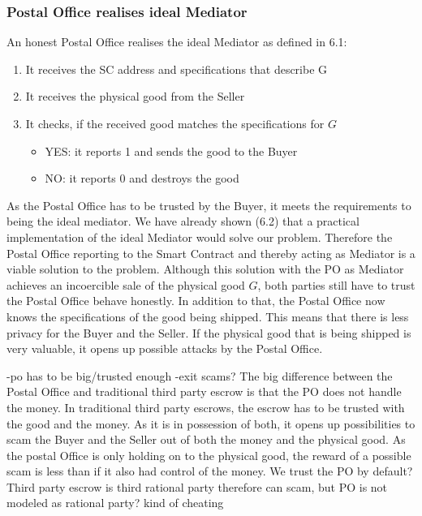 \documentclass{cacthesis}
\begin{document}
\subsubsection{Postal Office realises ideal Mediator}
An honest Postal Office realises the ideal Mediator as defined in 6.1:
\begin{enumerate}
    \item It receives the SC address and specifications that describe G
    \item It receives the physical good from the Seller
    \item It checks, if the received good matches the specifications for $G$
        \begin{itemize}
            \item YES: it reports 1 and sends the good to the Buyer
            \item NO: it reports 0 and destroys the good
        \end{itemize}
\end{enumerate}
As the Postal Office has to be trusted by the Buyer, it meets the requirements to being the ideal mediator. We have already shown (6.2) that a practical implementation of the ideal Mediator would solve our problem. Therefore the Postal Office reporting to the Smart Contract and thereby acting as Mediator is a viable solution to the problem.
Although this solution with the PO as Mediator achieves an incoercible sale of the physical good $G$, both parties still have to trust the Postal Office behave honestly.\newline
In addition to that, the Postal Office now knows the specifications of the good being shipped. This means that there is less privacy for the Buyer and the Seller. If the physical good that is being shipped is very valuable, it opens up possible attacks by the Postal Office.\newline

-po has to be big/trusted enough\newline
-exit scams?
The big difference between the Postal Office and traditional third party escrow is that the PO does not handle the money. \newline
In traditional third party escrows, the escrow has to be trusted with the good and the money. As it is in possession of both, it opens up possibilities to scam the Buyer and the Seller out of both the money and the physical good.\newline
As the postal Office is only holding on to the physical good, the reward of a possible scam is less than if it also had control of the money.\newline
We trust the PO by default? Third party escrow is third rational party therefore can scam, but PO is not modeled as rational party? kind of cheating
\end{document}
